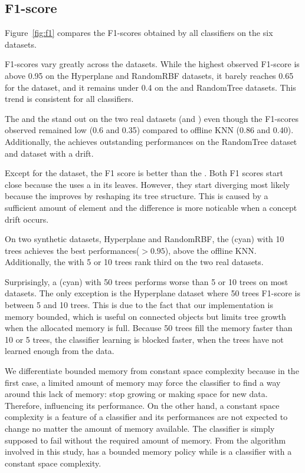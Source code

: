 \subsection{F1-score}
Figure~\ref{fig:f1} compares the F1-scores obtained by all classifiers on the
six datasets.

F1-scores vary greatly across the datasets. While the highest
observed F1-score is above 0.95 on the Hyperplane and RandomRBF datasets,
it barely reaches 0.65 for the \banosdataset dataset, and it remains under
0.4 on the \recofitdataset and RandomTree datasets. This trend is
consistent for all classifiers.

The \naivebayes and the \hoeffdingtree stand out on the two real datasets
(\banosdataset and \recofitdataset) even though the F1-scores observed remained
low (0.6 and 0.35) compared to offline KNN (0.86 and 0.40). Additionally, the
\hoeffdingtree achieves outstanding performances on the RandomTree dataset and
\banosdataset dataset with a drift.

Except for the \banosdataset dataset, the \hoeffdingtree F1 score is better than
the \naivebayes. Both F1 scores start close because the \hoeffdingtree uses a
\naivebayes in its leaves.  However, they start diverging most likely because
the \hoeffdingtree improves by reshaping its tree structure.  This is caused by
a sufficient amount of element and the difference is more noticable when a
concept drift occurs.

On two synthetic datasets, Hyperplane and RandomRBF, the \mondrianforest (cyan)
with 10 trees achieves the best performances($> 0.95$), above the offline KNN.
Additionally, the \mondrianforest with 5 or 10 trees rank third on the two real
datasets.

Surprisingly, a \mondrianforest (cyan) with 50 trees performs worse than 5 or 10
trees on most datasets. The only exception is the Hyperplane dataset where
50 trees F1-score is between 5 and 10 trees. This is due to the fact that
our \mondrianforest implementation is memory bounded, which is
useful on connected objects but limits tree growth when the allocated memory is
full. Because 50 trees fill the memory faster than 10 or 5 trees, the
classifier learning is blocked faster, when the trees have not learned enough
from the data.

We differentiate bounded memory from constant space complexity because in the
first case, a limited amount of memory may force the classifier to find a way
around this lack of memory: stop growing or making space for new data.
Therefore, influencing its performance.  On the other hand, a constant space
complexity is a feature of a classifier and its performances are not expected
to change no  matter the amount of memory available. The classifier is simply
supposed to fail without the required amount of memory. From the algorithm
involved in this study, \mondrianforest has a bounded memory policy while
\naivebayes is a classifier with a constant space complexity.

